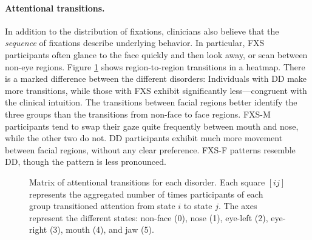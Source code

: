 \documentclass{llncs}
\begin{document}
  \paragraph{Attentional transitions.} In addition to the distribution of fixations, clinicians also believe that the \emph{sequence} of fixations describe underlying behavior. In particular, FXS participants often glance to the face quickly and then look away, or scan between non-eye regions. Figure \ref{fig:transitions} shows region-to-region transitions in a heatmap. There is a marked difference between the different disorders: Individuals with DD make more transitions, while those with FXS exhibit significantly less---congruent with the clinical intuition. The transitions between facial regions better identify the three groups than the transitions from non-face to face regions. FXS-M participants tend to swap their gaze quite frequently between mouth and nose, while the other two do not. DD participants exhibit much more movement between facial regions, without any clear preference. FXS-F patterns resemble DD, though the pattern is less pronounced.
  
  \begin{figure}[t]
    \hfill
    \hfill
    \caption{Matrix of attentional transitions for each disorder. Each square $[ij]$ represents the aggregated number of times participants of each group transitioned attention from state $i$ to state $j$.  The axes represent the different states: non-face (0), nose (1), eye-left (2), eye-right (3), mouth (4), and jaw (5).}
    \label{fig:transitions}
  \end{figure}
\end{document}
